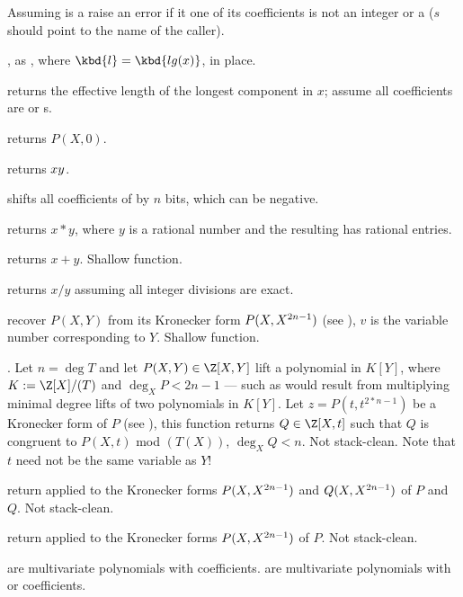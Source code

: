 
 Assuming  is a 
raise an error if it one of its coefficients is not an integer or a 
($s$ should point to the name of the caller).

, as , where
$\kbd{l} = \kbd{lg(x)}$, in place.

 returns the effective length of the longest
component in $x$; assume all coefficients are  or s.

 returns $P(X, 0)$.

 returns $x\*y$.

 shifts all coefficients of  by $n$
bits, which can be negative.

 returns $x*y$, where $y$ is a rational number
and the resulting  has rational entries.

 returns $x+y$. Shallow function.

 returns $x/y$ assuming all integer
divisions are exact.

 recover $P(X,Y)$
from its Kronecker form $P(X,X^{2\*n-1})$ (see ),
$v$ is the variable number corresponding to $Y$. Shallow function.

. Let $n = \deg T$ and let
$P(X,Y)\in \Z[X,Y]$ lift a polynomial in $K[Y]$, where $K := \Z[X]/(T)$ and
$\deg_X P < 2n-1$ --- such as would result from multiplying minimal degree
lifts of two polynomials in $K[Y]$. Let $z = P(t,t^{2*n-1})$ be a Kronecker
form of $P$ (see ), this function returns $Q\in
\Z[X,t]$ such that $Q$ is congruent to $P(X,t)$ mod $(T(X))$, $\deg_X Q <
n$. Not stack-clean. Note that $t$ need not be the same variable as $Y$!

 return 
applied to the Kronecker forms $P(X,X^{2\*n-1})$ and $Q(X,X^{2\*n-1})$
of $P$ and $Q$. Not stack-clean.

 return 
applied to the Kronecker forms $P(X,X^{2\*n-1})$
of $P$. Not stack-clean.

 are multivariate polynomials with  coefficients.
 are multivariate polynomials with  or  coefficients.

